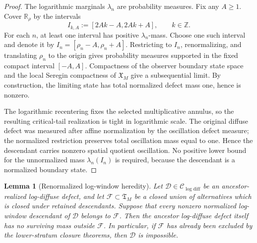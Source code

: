 \documentclass[11pt]{amsart}
\numberwithin{equation}{section}
\theoremstyle{plain}
\newtheorem{lemma}[theorem]{Lemma}
\theoremstyle{definition}
\theoremstyle{remark}
\newcommand{\Tcrit}{\mathfrak T_M}
\newcommand{\Clogdiff}{\mathcal C_{\log\mathrm{diff}}}
\begin{document}
\begin{proof}
The logarithmic marginals \(\lambda_n\) are probability measures.  Fix any
\(A\ge1\).  Cover \(\mathbb R_\rho\) by the intervals
\[
   I_{k,A}:=[2Ak-A,2Ak+A],\qquad k\in\mathbb Z .
\]
For each \(n\), at least one interval has positive \(\lambda_n\)-mass.  Choose
one such interval and denote it by \(I_n=[\rho_n-A,\rho_n+A]\).  Restricting to
\(I_n\), renormalizing, and translating \(\rho_n\) to the origin gives
probability measures supported in the fixed compact interval \([-A,A]\).
Compactness of the observer boundary state space and the local Seregin
compactness of \(\mathfrak X_M\) give a subsequential limit.  By construction,
the limiting state has total normalized defect mass one, hence is nonzero.

The logarithmic recentering fixes the selected multiplicative annulus, so the
resulting critical-tail realization is tight in logarithmic scale.  The
original diffuse defect was measured after affine normalization by the
oscillation defect measure; the normalized restriction preserves total
oscillation mass equal to one.  Hence the descendant carries nonzero
spatial quotient oscillation.  No positive lower bound for the unnormalized
mass \(\lambda_n(I_n)\) is required, because the descendant is a normalized
boundary state.
\end{proof}

\begin{lemma}[Renormalized log-window heredity]
\label{lem:renormalized-log-window-heredity}
Let \(\mathcal D\in\Clogdiff\) be an ancestor-realized log-diffuse defect, and
let \(\mathcal F\subset\Tcrit\) be a closed union of alternatives which is
closed under retained descendants.  Suppose that every nonzero normalized
log-window descendant of \(\mathcal D\) belongs to \(\mathcal F\).  Then the
ancestor log-diffuse defect itself has no surviving mass outside
\(\mathcal F\).  In particular, if \(\mathcal F\) has already been excluded
by the lower-stratum closure theorems, then \(\mathcal D\) is impossible.
\end{lemma}
\end{document}

